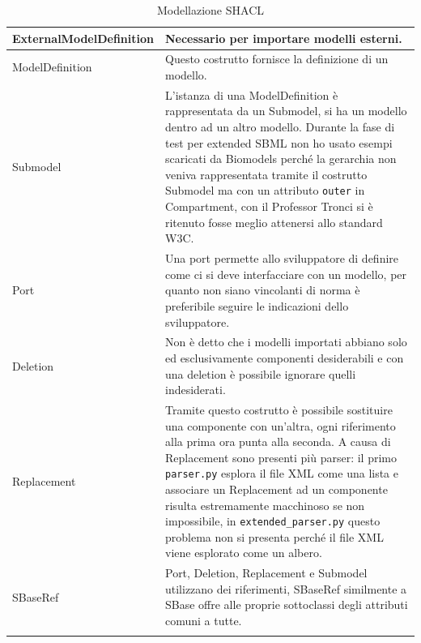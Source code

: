 \documentclass{article}
\begin{document}
\begin{longtable}{p{}p{}}
    \hline
    ExternalModelDefinition &  Necessario per importare modelli esterni. \\
    \hline
    ModelDefinition & Questo costrutto fornisce la definizione di un modello. \\ 
    \hline
    Submodel & L'istanza di una ModelDefinition è rappresentata da un Submodel, si ha un modello dentro ad un altro modello. Durante la fase di test per extended SBML non ho usato esempi scaricati da Biomodels perché la gerarchia non veniva rappresentata tramite il costrutto Submodel ma con un attributo \texttt{outer} in Compartment, con il Professor Tronci si è ritenuto fosse meglio attenersi allo standard W3C. \\ 
    \hline
    Port & Una port permette allo sviluppatore di definire come ci si deve interfacciare con un modello, per quanto non siano vincolanti di norma è preferibile seguire le indicazioni dello sviluppatore. \\ 
    \hline
    Deletion & Non è detto che i modelli importati abbiano solo ed esclusivamente componenti desiderabili e con una deletion è possibile ignorare quelli indesiderati. \\
    \hline
    Replacement & Tramite questo costrutto è possibile sostituire una componente con un'altra, ogni riferimento alla prima ora punta alla seconda. A causa di Replacement sono presenti più parser: il primo \texttt{parser.py} esplora il file XML come una lista e associare un Replacement ad un componente risulta estremamente macchinoso se non impossibile, in \texttt{extended\_parser.py} questo problema non si presenta perché il file XML viene esplorato come un albero. \\
    \hline
    SBaseRef & Port, Deletion, Replacement e Submodel utilizzano dei riferimenti, SBaseRef similmente a SBase offre alle proprie sottoclassi degli attributi comuni a tutte. \\
    \hline

    \caption{Modellazione SHACL}
    \label{tab:modellazione}
\end{longtable}
\end{document}
